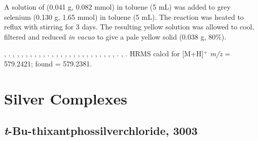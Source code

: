 A solution of \tBuxantphos{} (0.041 g, 0.082 mmol) in toluene (5 mL) was added to grey selenium (0.130 g, 1.65 mmol) in toluene (5 mL).  The reaction was heated to reflux with stirring for 3 days.  The resulting yellow solution was allowed to cool, filtered and reduced \emph{in vacuo} to give a pale yellow solid (0.038 g, 80\%).    

,
.
,
,
,
,
,
,
,
,
.
,
,
,
,
,
,
,
,
,
,
,
,
,
,
,
.
,
.
HRMS calcd for  [M+H]$^+$ \emph{m/z} = 579.2421; found = 579.2381.

\section{Silver Complexes}
\label{section:experimental:silver}



\subsection*{\emph{t}-Bu-thixantphossilverchloride, 3003} 

